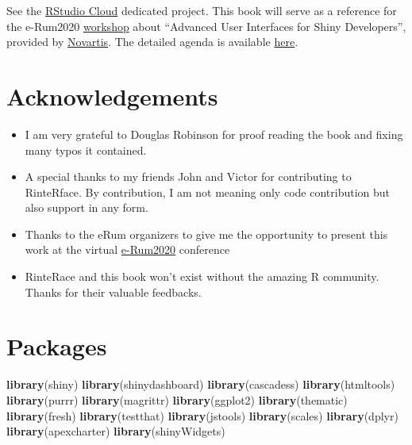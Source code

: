 \documentclass[
]{book}
\newenvironment{Shaded}{\begin{snugshade}}{\end{snugshade}}
\newcommand{\KeywordTok}[1]{\textcolor[rgb]{0.13,0.29,0.53}{\textbf{#1}}}
\newcommand{\NormalTok}[1]{#1}
\providecommand{\tightlist}{%
  \setlength{\itemsep}{0pt}\setlength{\parskip}{0pt}}
\begin{document}
See the \href{https://rstudio.cloud}{RStudio Cloud} dedicated project.
This book will serve as a reference for the e-Rum2020 \href{https://2020.erum.io/program/workshops/}{workshop} about ``Advanced User Interfaces for Shiny Developers'', provided by \href{https://www.novartis.com}{Novartis}. The detailed agenda is available \href{https://github.com/Novartis/Advanced-User-Interfaces-for-Shiny-Developers}{here}.

\hypertarget{acknowledgements}{%
\section*{Acknowledgements}\label{acknowledgements}}

\begin{itemize}
\tightlist
\item
  I am very grateful to Douglas Robinson for proof reading the book and fixing many typos it contained.
\item
  A special thanks to my friends John and Victor for contributing to RinteRface. By contribution, I am not meaning only code contribution but also support in any form.
\item
  Thanks to the eRum organizers to give me the opportunity to present this work at the virtual \href{https://2020.erum.io}{e-Rum2020} conference
\item
  RinteRace and this book won't exist without the amazing R community. Thanks for their valuable feedbacks.
\end{itemize}

\hypertarget{packages}{%
\section*{Packages}\label{packages}}

\begin{Shaded}
\begin{Highlighting}[]
\KeywordTok{library}\NormalTok{(shiny)}
\KeywordTok{library}\NormalTok{(shinydashboard)}
\KeywordTok{library}\NormalTok{(cascadess)}
\KeywordTok{library}\NormalTok{(htmltools)}
\KeywordTok{library}\NormalTok{(purrr)}
\KeywordTok{library}\NormalTok{(magrittr)}
\KeywordTok{library}\NormalTok{(ggplot2)}
\KeywordTok{library}\NormalTok{(thematic)}
\KeywordTok{library}\NormalTok{(fresh)}
\KeywordTok{library}\NormalTok{(testthat)}
\KeywordTok{library}\NormalTok{(jstools)}
\KeywordTok{library}\NormalTok{(scales)}
\KeywordTok{library}\NormalTok{(dplyr)}
\KeywordTok{library}\NormalTok{(apexcharter)}
\KeywordTok{library}\NormalTok{(shinyWidgets)}
\end{Highlighting}
\end{Shaded}
\end{document}

